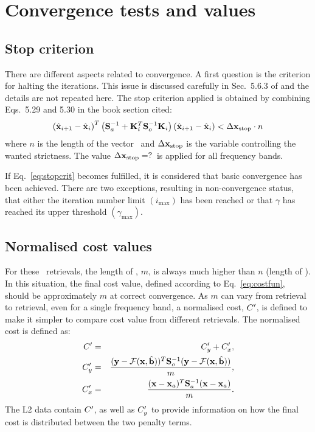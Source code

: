 \section{Convergence tests and values}
\label{sec:conv}
%
\subsection{Stop criterion}
There are different aspects related to convergence. A first question is the
criterion for halting the iterations. This issue is discussed carefully in
Sec.~5.6.3 of \citet{rodgers:00} and the details are not repeated here. The
stop criterion applied is obtained by combining Eqs.~5.29 and 5.30 in the
book section cited:
\begin{equation}
  \label{eq:stopcrit}
  \left( \hat{\mathbf{x}}_{i+1} - \hat{\mathbf{x}}_i \right)^T
  \left( \mathbf{S}_{a}^{-1} + 
         \mathbf{K}_{i}^T\mathbf{S}_{o}^{-1}\mathbf{K}_{i} \right)
  \left( \hat{\mathbf{x}}_{i+1} - \hat{\mathbf{x}}_i \right) < \Delta\mathbf{x}_\mathrm{stop} \cdot n
\end{equation}
where $n$ is the length of the vector \SttVct\ and
$\Delta\mathbf{x}_\mathrm{stop}$ is the variable controlling the wanted
strictness. The value $\Delta\mathbf{x}_\mathrm{stop}=?$\ is
applied for all frequency bands. 

If Eq.~\ref{eq:stopcrit} becomes fulfilled, it is considered that basic
convergence has been achieved. There are two exceptions, resulting in
non-convergence status, that either the iteration number limit
$(i_\mathrm{max})$ has been reached or that $\gamma$ has reached its upper
threshold $(\gamma_\mathrm{max})$.
\\


\subsection{Normalised cost values}
%
For these \smr\ retrievals, the length of \MsrVct, $m$, is always much higher
than $n$ (length of \SttVct). In this situation, the final cost value, defined
according to Eq.~\ref{eq:costfun}, should be approximately $m$ at correct
convergence. As $m$ can vary from retrieval to retrieval, even for a single
frequency band, a normalised cost, $C'$, is defined to make it simpler to
compare cost value from different retrievals. The normalised cost is
defined as:
\begin{eqnarray}
  \label{eq:scaledc}
  C' &=& C_y' + C_x', \\
  C_y' &=& \frac{(\mathbf{y}-\mathcal{F}(\mathbf{x},\hat{\mathbf{b}}))^T\mathbf{S}_{o}^{-1}
  (\mathbf{y}-\mathcal{F}(\mathbf{x},\hat{\mathbf{b}}))}{m},\\
  C_x' &=& \frac{(\mathbf{x}-\mathbf{x}_{a})^T\mathbf{S}_{a}^{-1}(\mathbf{x}-\mathbf{x}_{a})}{m}.\\
\end{eqnarray}
The L2 data contain $C'$, as well as $C_y'$ to provide information
on how the final cost is distributed between the two penalty terms.


